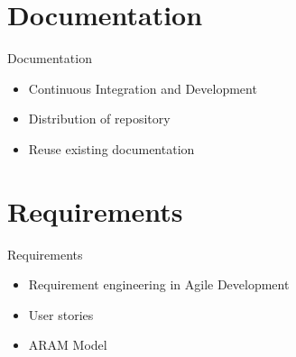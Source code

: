 \documentclass{beamer}
\begin{document}
    \section{Documentation}

    \begin{frame}{Documentation}
    \begin{itemize}
        \item Continuous Integration and Development
        \item Distribution of repository
        \item Reuse existing documentation
    \end{itemize}
    \end{frame}


    \section{Requirements}

    \begin{frame}{Requirements}
    \begin{itemize}
        \item Requirement engineering in Agile Development
        \item User stories
        \item ARAM Model    
    \end{itemize}
    \end{frame}

    
\end{document}
